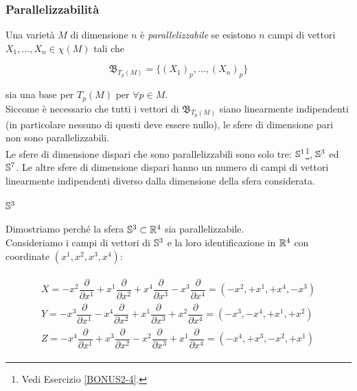 \subsubsection{Parallelizzabilità}

Una varietà $ M $ di dimensione $ n $ è \textit{parallelizzabile} se esistono $ n $ campi di vettori $ X_{1},\dots,X_{n} \in \chi(M) $ tali che

\begin{equation}
	\mathfrak{B}_{T_{p}(M)} = \{ (X_{1})_{p},\dots,(X_{n})_{p} \}
\end{equation}

sia una base per $ T_{p}(M) $ per $ \forall p \in M $.\\
Siccome è necessario che tutti i vettori di $ \mathfrak{B}_{T_{p}(M)} $ siano linearmente indipendenti (in particolare nessuno di questi deve essere nullo), le sfere di dimensione pari non sono parallelizzabili.\\
Le sfere di dimensione dispari che sono parallelizzabili sono solo tre: $ \S^{1} $\footnote{%
	Vedi Esercizio \ref{BONUS2-4}.%
}, $ \S^{3} $ ed $ \S^{7} $. Le altre sfere di dimensione dispari hanno un numero di campi di vettori linearmente indipendenti diverso dalla dimensione della sfera considerata.

\paragraph{$ \S^{3} $}

Dimostriamo perché la sfera $ \S^{3} \subset \R^{4} $ sia parallelizzabile.\\
Consideriamo i campi di vettori di $ \S^{3} $ e la loro identificazione in $ \R^{4} $ con coordinate $ (x^{1},x^{2},x^{3},x^{4}) $:

\begin{align}
	\begin{split}
		X = - x^{2} \dfrac{\partial}{\partial x^{1}} + x^{1} \dfrac{\partial}{\partial x^{2}} + x^{4} \dfrac{\partial}{\partial x^{3}} - x^{3} \dfrac{\partial}{\partial x^{4}} = (-x^{2}, +x^{1}, +x^{4}, -x^{3})\\
		Y = - x^{3} \dfrac{\partial}{\partial x^{1}} - x^{4} \dfrac{\partial}{\partial x^{2}} + x^{1} \dfrac{\partial}{\partial x^{3}} + x^{2} \dfrac{\partial}{\partial x^{4}} = (-x^{3}, -x^{4}, +x^{1}, +x^{2})\\
		Z = - x^{4} \dfrac{\partial}{\partial x^{1}} + x^{3} \dfrac{\partial}{\partial x^{2}} - x^{2} \dfrac{\partial}{\partial x^{3}} + x^{1} \dfrac{\partial}{\partial x^{4}} = (-x^{4}, +x^{3}, -x^{2}, +x^{1})
	\end{split}
\end{align}

